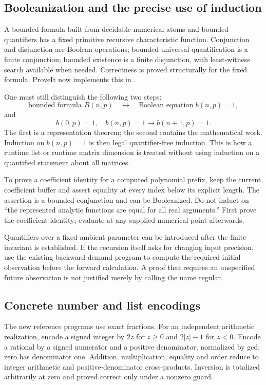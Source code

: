 \subsection{Booleanization and the precise use of induction}

A bounded formula built from decidable numerical atoms and bounded quantifiers has a fixed primitive recursive characteristic function. Conjunction and disjunction are Boolean operations; bounded universal quantification is a finite conjunction; bounded existence is a finite disjunction, with least-witness search available when needed. Correctness is proved structurally for the fixed formula. ProveIt now implements this in  \cite{repo-audit}.

One must still distinguish the following two steps:
\[
 \text{bounded formula }B(n,p)
 \quad\longleftrightarrow\quad
 \text{Boolean equation }b(n,p)=1,
\]
and
\[
 b(0,p)=1,\quad b(n,p)=1\to b(n+1,p)=1.
\]
The first is a representation theorem; the second contains the mathematical work. Induction on $b(n,p)=1$ is then legal quantifier-free induction. This is how a runtime list or runtime matrix dimension is treated without using induction on a quantified statement about all matrices.

\begin{example}
To prove a coefficient identity for a computed polynomial prefix, keep the current coefficient buffer and assert equality at every index below its explicit length. The assertion is a bounded conjunction and can be Booleanized. Do not induct on ``the represented analytic functions are equal for all real arguments.'' First prove the coefficient identity; evaluate at any supplied numerical point afterwards.
\end{example}

Quantifiers over a fixed ambient parameter can be introduced after the finite invariant is established. If the recursion itself asks for changing input precision, use the existing backward-demand program to compute the required initial observation before the forward calculation. A proof that requires an unspecified future observation is not justified merely by calling the name regular.

\subsection{Concrete number and list encodings}

The new reference programs use exact fractions. For an independent arithmetic realization, encode a signed integer by $2z$ for $z\ge0$ and $2|z|-1$ for $z<0$. Encode a rational by a signed numerator and a positive denominator, normalized by gcd; zero has denominator one. Addition, multiplication, equality and order reduce to integer arithmetic and positive-denominator cross-products. Inversion is totalized arbitrarily at zero and proved correct only under a nonzero guard.


